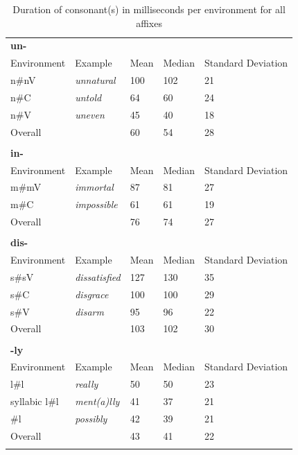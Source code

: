   
  \begin{table}
  	\caption{Duration of consonant(s) in milliseconds per environment for all affixes}
  	\label{tbl:Corpus raw duration}
  	
  		\begin{tabular} {lllll}
  			\lsptoprule
  			\textbf{un-}\\
  			Environment & Example & Mean & Median& Standard Deviation\\
  			\midrule			
  			n\#nV&\color{lsMidBlue}\textit{unnatural} & 100 & 102 & 21\\ 
  			n\#C&\color{lsMidBlue}\textit{untold} & 64 & 60 & 24\\ 
  			n\#V&\color{lsMidBlue}\textit{uneven} & 45 & 40 & 18\\
  			\midrule   	
  			Overall &  & 60 & 54 & 28\\ 
  			\midrule
  			\\
  			\textbf{in-}\\
  			
  			Environment & Example & Mean & Median& Standard Deviation\\
  			\midrule			
  			m\#mV&\color{lsMidBlue}\textit{immortal} & 87 & 81 & 27\\   	
  			m\#C&\color{lsMidBlue}\textit{impossible} & 61 & 61 & 19\\ 
  			\midrule   	
  			Overall &  & 76 & 74 & 27\\ 
  			\midrule   
  			\\
  			\textbf{dis-}\\
  			Environment & Example & Mean & Median& Standard Deviation\\
  			\midrule			
  			s\#sV&\color{lsMidBlue}\textit{dissatisfied} & 127 & 130  &35 \\ 
  			s\#C&\color{lsMidBlue}\textit{disgrace} & 100 & 100& 29\\ 
  			s\#V&\color{lsMidBlue}\textit{disarm} &95 & 96 & 22 \\ 
  			\midrule   	
  			Overall &   &103   & 102  & 30  \\ 
  			\midrule   	
  			\\
  			\textbf{-ly}\\
  			\midrule
  			Environment & Example & Mean & Median& Standard Deviation\\
  			\midrule			
  			l\#l&\color{lsMidBlue}\textit{really} & 50  & 50 & 23 \\ 
  			\is{syllabicity}syllabic l\#l&\color{lsMidBlue}\textit{ment(a)lly} &41 & 37  & 21\\ 
  			\#l&\color{lsMidBlue}\textit{possibly} & 42& 39& 21\\ 
  			\midrule   	
  			Overall &  &43  &41 &22\\ 
  			\lspbottomrule                                                                                
		\end{tabular}
  	
  \end{table}
  

